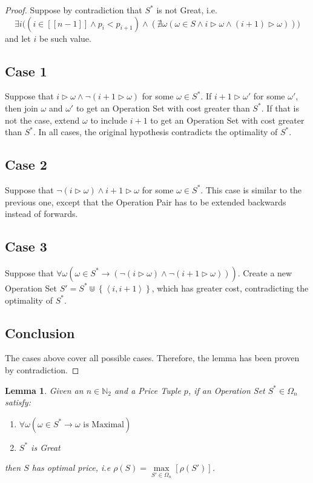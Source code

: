 \documentclass{article}
\newcommand{\N}{\mathbb{N}}
\newcommand{\Nb}[1]{\ensuremath{\N_{#1}}}
\newcommand{\Nt}{\Nb{2}}
\newcommand{\range}[1]{\ensuremath{\left[\left[ #1 \right]\right]}}
\newcommand{\tuple}[1]{\ensuremath{\left\langle #1 \right\rangle}}
\newcommand{\Set}[1]{\ensuremath{\left\{ #1 \right\}}}
\newcommand{\incl}[2]{#1 \triangleright #2}
\newcommand{\great}{Great\xspace}
\newcommand{\op}{\ensuremath{\omega}}
\newcommand{\price}[1]{\ensuremath{\rho\left( #1 \right)}}
\newcommand{\OS}{\ensuremath{\Omega_{n}}}
\newcommand{\sopt}{\ensuremath{S^{*}}}
\theoremstyle{definition}
\theoremstyle{plain}
\newtheorem{lemma}{Lemma}
\begin{document}
\begin{proof}
    Suppose by contradiction that $\sopt$ is not \great, i.e.
    \begin{equation}
        \exists i \big(
            \left( i \in \range{n-1} \land p_{i} < p_{i+1}  \right)
            \land
            \left( \nexists \op \left(
                \op \in S \land i \triangleright \op \land (i+1) \triangleright \op
            \right) \right)
        \big)
    \end{equation}
    and let $i$ be such value.

    \subsection*{Case 1}
    Suppose that $\incl{i}{\op} \land \neg (\incl{i+1}{\op})$ for some $\op \in \sopt$. If $\incl{i+1}{\op'}$ for some $\op'$, then join $\op$ and $\op'$ to get an Operation Set with cost greater than $\sopt$. If that is not the case, extend $\op$ to include $i+1$ to get an Operation Set with cost greater than $\sopt$. In all cases, the original hypothesis contradicts the optimality of $\sopt$.

    \subsection*{Case 2}
    Suppose that $\neg (\incl{i}{\op}) \land \incl{i+1}{\op}$ for some $\op \in \sopt$. This case is similar to the previous one, except that the Operation Pair has to be extended backwards instead of forwards.

    \subsection*{Case 3}
    Suppose that $\forall \op (\op \in \sopt \rightarrow (\neg (\incl{i}{\op}) \land \neg (\incl{i+1}{\op})))$. Create a new Operation Set $S' = \sopt \Cup \Set{\tuple{i, i+1}}$, which has greater cost, contradicting the optimality of $\sopt$.

    \subsection*{Conclusion}
    The cases above cover all possible cases. Therefore, the lemma has been proven by contradiction.
\end{proof}

\begin{lemma}
    \label{lemma:opt-price-III}
    Given an $n \in \Nt$ and a Price Tuple $p$, if an Operation Set $\sopt \in \OS$ satisfy:
    \begin{enumerate}
        \item $\forall \op \left(
            \op \in \sopt \rightarrow \op \mbox{ is Maximal}
        \right)$
        \item $\sopt$ is \great
    \end{enumerate}
    then $S$ has optimal price, i.e $ \price{S} = \max\limits_{S' \in \OS} [\price{S'}] $.
\end{lemma}
\end{document}
